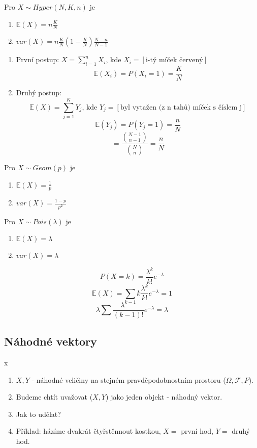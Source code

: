 \documentclass[../main.tex]{subfiles}
\begin{document}
\begin{theorem}
    Pro $X\sim Hyper(N,K,n)$ je
    \begin{enumerate}
        \item $\mathbb{E}(X) = n\frac{K}{N}$
        \item $var(X) = n\frac{K}{N}(1-\frac{K}{N})\frac{N-n}{N-1}$
    \end{enumerate}
    \begin{enumerate}
        \item První postup: $X = \sum^n_{i=1}X_i$, kde $X_i = [\text{i-tý míček červený}]$
        \[\mathbb{E}(X_i) = P(X_i = 1) = \frac{K}{N}\]
        \item Druhý postup:
        \[\mathbb{E}(X) = \sum^K_{j=1} Y_j\text{, kde } Y_j = [\text{byl vytažen (z n tahů) míček s číslem j}]\]
        \[\mathbb{E}(Y_j) = P(Y_j = 1) = \frac{n}{N} \]
        \[= \frac{\binom{N-1}{n-1}}{\binom{N}{n}} = \frac{n}{N}\]
    \end{enumerate}
\end{theorem}

\begin{theorem}
    Pro $X\sim Geom(p)$ je
    \begin{enumerate}
        \item $\mathbb{E}(X) = \frac{1}{p}$
        \item $var(X) = \frac{1-p}{p^2}$
    \end{enumerate}
\end{theorem}

\begin{theorem}
    Pro $X\sim Pois(\lambda)$ je
    \begin{enumerate}
        \item $\mathbb{E}(X) = \lambda$
        \item $var(X) = \lambda$
    \end{enumerate}
    \[P(X=k) = \frac{\lambda^k}{k!}e^{-\lambda}\]
    \[\mathbb{E}(X) = \sum k \frac{\lambda^k}{k!}e^{-\lambda} = 1\]
    \[\lambda \sum \frac{\lambda^{k-1}}{(k-1)!}e^{-\lambda} = \lambda\]    
\end{theorem}

\subsection{Náhodné vektory}

\begin{definition}
    {\color{white} x}
    \begin{enumerate}
        \item $X,Y$ - náhodné veličiny na stejném pravděpodobnostním prostoru ($\Omega, \mathcal{F},P$).
        \item Budeme chtít uvažovat ($X,Y$) jako jeden objekt - náhodný vektor.
        \item Jak to udělat?
        \item Příklad: házíme dvakrát čtyřstěnnout kostkou, $X = $ první hod, $Y = $ druhý hod.
    \end{enumerate}
\end{definition}
\end{document}
